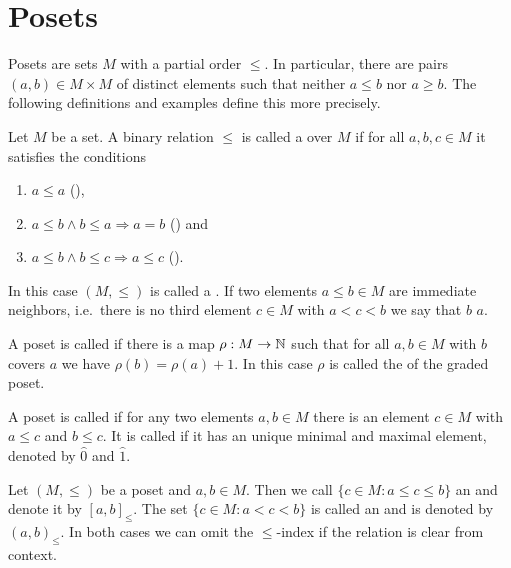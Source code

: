 \section{Posets}
\label{sec:posets}

Posets are sets $M$ with a partial order $\leq$. In particular, there are pairs $(a,b) \in M \times M$ of distinct elements such that neither $a \leq b$ nor $a \geq b$. The following definitions and examples define this more precisely.

\begin{defi}
	Let $M$ be a set. A binary relation $\leq$ is called a  over $M$ if for all $a,b,c \in M$ it satisfies the conditions
	\begin{enumerate}
		\item $a \leq a$ (),
		\item $a \leq b \wedge b \leq a \Rightarrow a=b$ () and
		\item $a \leq b \wedge b \leq c \Rightarrow a \leq c$ ().
	\end{enumerate}
	In this case $(M,\leq)$ is called a . If two elements $a \leq b \in M$ are immediate neighbors, i.e.\ there is no third element $c \in M$ with $a < c < b$ we say that $b$  $a$.
\end{defi}

\begin{defi}
	A poset is called  if there is a map $\rho : M \to \mathbb{N}$ such that for all $a,b \in M$ with $b$ covers $a$ we have $\rho(b) = \rho(a) + 1$. In this case $\rho$ is called the  of the graded poset.
\end{defi}

\begin{defi}
	A poset is called  if for any two elements $a,b \in M$ there is an element $c \in M$ with $a \leq c$ and $b \leq c$. It is called  if it has an unique minimal and maximal element, denoted by $\hat 0$ and $\hat 1$.
\end{defi}

\begin{defi}
	Let $(M,\leq)$ be a poset and $a,b \in M$. Then we call $\{ c \in M : a \leq c \leq b \}$ an  and denote it by $[a,b]_\leq$. The set $\{ c \in M : a < c < b \}$ is called an  and is denoted by $(a,b)_\leq$. In both cases we can omit the $\leq$-index if the relation is clear from context.
\end{defi}

